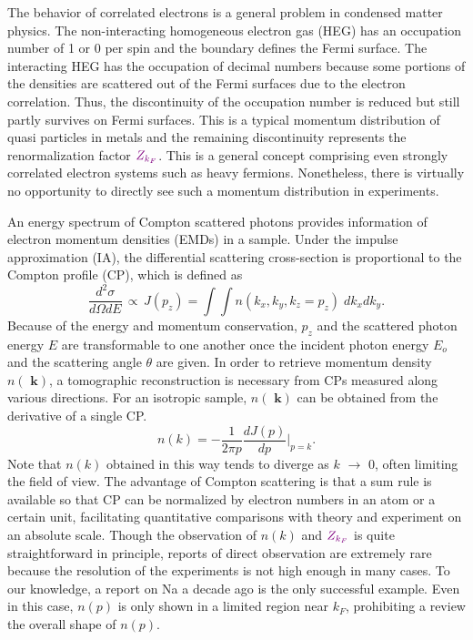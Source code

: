 \documentclass[twocolumn,showpacs,showkeys,fleqn,prl,superscriptaddress]{revtex4}%
\newcommand{\bb}[1]{\textbf{ #1}}
\begin{document}
The behavior of correlated electrons is a general problem in condensed matter physics.
The non-interacting homogeneous electron gas (HEG) has an occupation number of 1 or 0 per spin and the boundary defines the Fermi surface. 
The interacting HEG has the occupation of decimal numbers because some portions of the densities are scattered out of the Fermi surfaces due to the electron correlation. Thus, the discontinuity of the occupation number is reduced but still partly survives on Fermi surfaces. This is a typical momentum distribution of quasi particles in metals and the remaining discontinuity represents the renormalization factor ${\color{violet}Z_{k_F}}$. 
This is a general concept comprising even strongly correlated electron systems such as heavy fermions.         
Nonetheless, there is virtually no opportunity to directly see such a momentum distribution in experiments.

An energy spectrum of Compton scattered photons provides information of electron momentum densities (EMDs) in a sample\cite{sch}.
Under the impulse approximation (IA)\cite{eisen70,kaplan03}, the differential scattering cross-section is proportional to the Compton profile (CP), which is defined as
\begin{equation}
\frac{d^2\sigma}{d\Omega dE} \,\propto \, J(p_z) = \int \!\! \int n(k_x,k_y,k_z\!=\!p_z) \;dk_x dk_y .
\end{equation}
Because of the energy and momentum conservation, $p_z$ and the scattered photon energy $E$ are transformable to one another once the incident photon energy $E_o$ and the scattering angle $\theta$ are given.  
In order to retrieve momentum density $n(\!\!\bb{k})$, a tomographic reconstruction is necessary from CPs measured along various directions.
For an isotropic sample, $n(\!\!\bb{k})$ can be obtained from the derivative of a single CP. 
\begin{equation}
n(k) = - \frac{1}{2 \pi p} \frac{d J(p)}{d p}  | _{p=k}   .
\end{equation}
Note that $n(k)$ {\color{violet}obtained in this way}  tends to diverge as $k$ $\to$ 0, often limiting the field of view.  
The advantage of Compton scattering is that a sum rule is available so that CP can be normalized by electron numbers in an atom or a certain unit, facilitating quantitative comparisons with theory and experiment on an absolute scale.
Though the observation of $n(k)$ and ${\color{violet}Z_{k_F}}$ is quite straightforward in principle, reports of direct observation are extremely rare because the resolution of the experiments is not {\color{violet}high} enough in many cases.
To our knowledge, a report on Na a decade ago is the only successful example\cite{simo10}.
Even in this case, $n(p)$ is only shown in a limited region near $k_F$, prohibiting a review the overall shape of $n(p)$.
\end{document}
